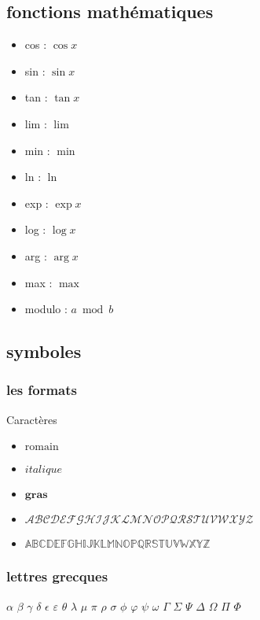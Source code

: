 \subsection{fonctions mathématiques}

\begin{itemize}
	\item cos : $\cos x$
	\item sin : $\sin x$
	\item tan : $\tan x$
	\item lim : $\lim$
	\item min : $\min$
	\item ln : $\ln $
	\item exp : $\exp x$
	\item log : $\log x$
	\item arg : $\arg x$
	\item max : $\max$
	\item modulo : $a \bmod b$
\end{itemize}


\subsection{symboles}

\subsubsection{les formats}

Caractères 
\begin{itemize}
	\item $\mathrm{romain}$
	\item $\mathit{italique}$
	\item $\mathbf{gras}$
	\item $\mathcal{ABCDEFGHIJKLMNOPQRSTUVWXYZ}$
	\item 
$\mathbb{ABCDEFGHIJKLMNOPQRSTUVWXYZ}$

\end{itemize}


\subsubsection{lettres grecques}

$\alpha$ $\beta$ $\gamma$ $\delta$ $\epsilon$ $\varepsilon$ $\theta$ $\lambda$ $\mu$ $\pi$ $\rho$ $\sigma$ $\phi$ $\varphi$ $\psi$ $\omega$ $\Gamma$ $\Sigma$ $\Psi$ $\Delta$ $\Omega$ $\Pi$ $\Phi$



